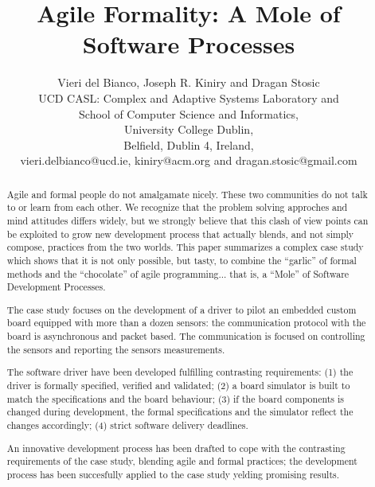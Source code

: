 \documentclass{article} \usepackage{times}
\begin{document}
\title{Agile Formality: A Mole of Software Processes}

\author{Vieri del Bianco, Joseph R. Kiniry and Dragan Stosic\\
  UCD CASL: Complex and Adaptive Systems Laboratory and\\
  School of Computer Science and Informatics,\\
  University College Dublin,\\
  Belfield, Dublin 4, Ireland,\\
  vieri.delbianco@ucd.ie, kiniry@acm.org and dragan.stosic@gmail.com\\
}

\maketitle

\begin{abstract}


  Agile and formal people do not amalgamate nicely.
  These two communities do not talk to or learn from each other. 
  We recognize that the problem solving approches and mind attitudes 
differs widely, but we strongly believe that this clash of view points 
can be exploited to grow new development process that actually blends, 
and not simply compose, practices from the two worlds.
  This paper summarizes a complex case study which shows that it is not 
only possible, but tasty, to combine the ``garlic'' of formal methods and the 
``chocolate'' of agile programming... that is, a ``Mole'' of Software Development 
Processes.

  The case study focuses on the development of a driver to pilot an 
embedded custom board equipped with more than a dozen sensors: the communication 
protocol with the board is asynchronous and packet based.
 The communication is focused on controlling the sensors and reporting 
the sensors measurements.

  The software driver have been developed fulfilling contrasting requirements: 
(1) the driver is formally specified, verified and validated;
(2) a board simulator is built to match the specifications and the board behaviour;
(3) if the board components is changed during development, the formal 
specifications and the simulator reflect the changes accordingly;
(4) strict software delivery deadlines.

  An innovative development process has been drafted to cope with the contrasting 
requirements of the case study, blending agile and formal practices; the 
development process has been succesfully applied to the case study yelding promising 
results.

\end{abstract}
\end{document}
